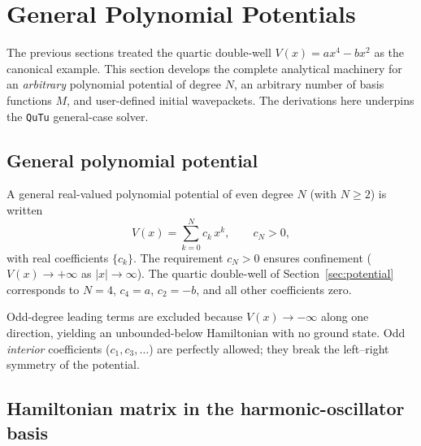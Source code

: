 \section{General Polynomial Potentials}\label{sec:general}

The previous sections treated the quartic double-well $V(x)=ax^4-bx^2$ as the
canonical example. This section develops the complete analytical machinery for
an \emph{arbitrary} polynomial potential of degree $N$, an arbitrary number of
basis functions $M$, and user-defined initial wavepackets. The derivations here
underpins the \texttt{QuTu} general-case solver.

\subsection{General polynomial potential}\label{sec:gen_pot}

A general real-valued polynomial potential of even degree $N$ (with $N \geq 2$)
is written
\begin{equation}\label{eq:gen_V}
  V(x) = \sum_{k=0}^{N} c_k\,x^k, \qquad c_N > 0,
\end{equation}
with real coefficients $\{c_k\}$.  The requirement $c_N > 0$ ensures
confinement ($V(x)\to+\infty$ as $|x|\to\infty$).  The quartic double-well
of Section~\ref{sec:potential} corresponds to $N=4$, $c_4=a$, $c_2=-b$, and
all other coefficients zero.

\begin{remark}
Odd-degree leading terms are excluded because $V(x)\to-\infty$ along one
direction, yielding an unbounded-below Hamiltonian with no ground state.
Odd \emph{interior} coefficients ($c_1,c_3,\ldots$) are perfectly allowed;
they break the left--right symmetry of the potential.
\end{remark}

\subsection{Hamiltonian matrix in the harmonic-oscillator basis}\label{sec:gen_H}

